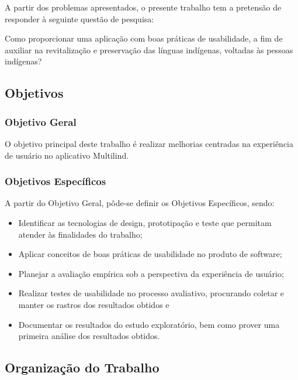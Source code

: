 A partir dos problemas apresentados, o presente trabalho tem a pretensão de responder à seguinte questão de pesquisa:

Como proporcionar uma aplicação com boas práticas de usabilidade, a fim de auxiliar na revitalização e preservação das línguas indígenas, voltadas às pessoas indígenas?

\subsection{Objetivos}

\subsubsection{Objetivo Geral}

O objetivo principal deste trabalho é realizar melhorias centradas na experiência de usuário no aplicativo Multilind.

\subsubsection{Objetivos Específicos}

\begin{description}
    \item A partir do Objetivo Geral, pôde-se definir os Objetivos Específicos, sendo:
          \begin{itemize}
              \item Identificar as tecnologias de design, prototipação e teste que permitam atender às finalidades do trabalho;

              \item Aplicar conceitos de boas práticas de usabilidade no produto de software;

              \item Planejar a avaliação empírica sob a perspectiva da experiência de usuário;

              \item Realizar testes de usabilidade no processo avaliativo, procurando coletar e manter os rastros dos resultados obtidos e

              \item Documentar os resultados do estudo exploratório, bem como prover uma primeira análise dos resultados obtidos.
          \end{itemize}
\end{description}

\subsection{Organização do Trabalho}

